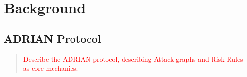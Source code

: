 \section{Background}
\label{sec:background}

\subsection{ADRIAN Protocol}
\label{ssec:adrian}
\begin{quote}\textcolor{red}{
    Describe the ADRIAN protocol, describing Attack graphs and Risk Rules as core mechanics. 
}\end{quote}
